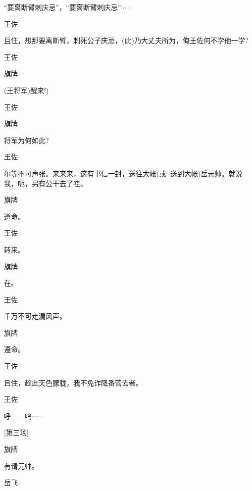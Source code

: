 {{{{``要离断臂刺庆忌''，``要离断臂刺庆忌''$\cdots{}\cdots{}$}

{王佐

且住，想那要离断臂，刺死公子庆忌，(此)乃大丈夫所为，俺王佐何不学他一学?}

{王佐

 }

{旗牌\hspace{30pt}~

(王将军)醒来!)}

{王佐

 }

{旗牌\hspace{30pt}~

将军为何如此?}

{王佐

尔等不可声张。来来来，这有书信一封，送往大帐({\akai 或}: 送到大帐)岳元帅。就说我，呃，另有公干去了哇。}

{旗牌\hspace{30pt}~

遵命。}

{王佐\hspace{30pt}~

转来。}

{旗牌\hspace{30pt}~

在。}

{王佐\hspace{30pt}~

千万不可走漏风声。}

{旗牌\hspace{30pt}~

遵命。}

{王佐\hspace{30pt}~

且住，趁此天色朦胧，我不免诈降番营去者。}

{王佐\hspace{30pt}~

呼------呜$\cdots{}\cdots{}$}

{[}第三场{]}

{旗牌\hspace{30pt}~

有请元帅。}

{岳飞\hspace{30pt}~

}}}}
